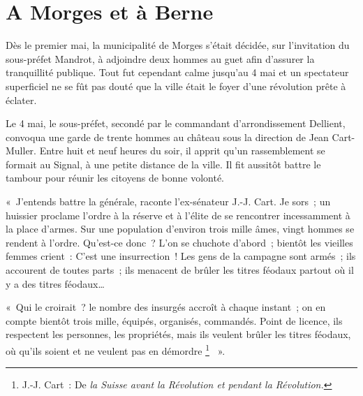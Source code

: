 \documentclass[french,twoside]{book} %
\newenvironment{quoteblock}%
  {\begin{quoting}}
  {\end{quoting}}
\newenvironment{quotebar}{%
    \def\FrameCommand{{\color{rubric!10!}\vrule width 0.5em} \hspace{0.9em}}%
    \def\OuterFrameSep{\itemsep} %
    \MakeFramed {\advance\hsize-\width \FrameRestore}
  }%
  {%
    \endMakeFramed
  }
\renewenvironment{quoteblock}%
  {%
    \savenotes
    \setstretch{0.9}
    \normalfont
    \begin{quotebar}
  }
  {%
    \end{quotebar}
    \spewnotes
  }
\begin{document}
\section[{A Morges et à Berne}]{A Morges et à Berne}
\noindent Dès le premier mai, la municipalité de Morges s’était décidée, sur l’invitation du sous-préfet Mandrot, à adjoindre deux hommes au guet afin d’assurer la tranquillité publique. Tout fut cependant calme jusqu’au 4 mai et un spectateur superficiel ne se fût pas douté que la ville était le foyer d’une révolution prête à éclater.\par
Le 4 mai, le sous-préfet, secondé par le commandant d’arrondissement Dellient, convoqua une garde de trente hommes au château sous la direction de Jean Cart-Muller. Entre huit et neuf heures du soir, il apprit qu’un rassemblement se formait au Signal, à une petite distance de la ville. Il fit aussitôt battre le tambour pour réunir les citoyens de bonne volonté.\par

\begin{quoteblock}
 \noindent « J’entends battre la générale, raconte l’ex-sénateur J.-J. Cart. Je sors ; un huissier proclame l’ordre à la réserve et à l’élite de se rencontrer incessamment à la place d’armes. Sur une population d’environ trois mille âmes, vingt hommes se rendent à l’ordre. Qu’est-ce donc ? L’on se chuchote d’abord ; bientôt les vieilles femmes crient : C’est une insurrection ! Les gens de la campagne sont armés ; ils accourent de toutes parts ; ils menacent de brûler les titres féodaux partout où il y a des titres féodaux…\par
 « Qui le croirait ? le nombre des insurgés accroît à chaque instant ; on en compte bientôt trois mille, équipés, organisés, commandés. Point de licence, ils respectent les personnes, les propriétés, mais ils veulent brûler les titres féodaux, où qu’ils soient et ne veulent pas en démordre \footnote{J.-J. Cart : De \emph{la Suisse avant la Révolution et pendant la Révolution.}}  ».
 \end{quoteblock}
\end{document}
